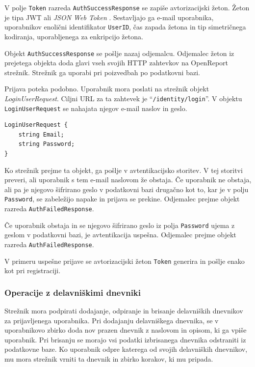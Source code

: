 \documentclass[a4paper, 12pt]{book}
\begin{document}
\noindent V polje \texttt{Token} razreda \texttt{AuthSuccessResponse} se zapiše avtorizacijski žeton.
Žeton je tipa JWT ali \textit{JSON Web Token} \cite{jwtinfo}.
Sestavljajo ga e-mail uporabnika, uporabnikov enolični identifikator \texttt{UserID}, čas zapada žetona in tip simetričnega kodiranja, uporabljenega za enkripcijo žetona.

Objekt \texttt{AuthSuccessResponse} se pošlje nazaj odjemalcu.
Odjemalec žeton iz prejetega objekta doda glavi vseh svojih HTTP zahtevkov na OpenReport strežnik.
Strežnik ga uporabi pri poizvedbah po podatkovni bazi.

Prijava poteka podobno.
Uporabnik mora poslati na strežnik objekt \textit{LoginUserRequest}.
Ciljni URL za ta zahtevek je \enquote{\texttt{/identity/login}}.
V objektu \texttt{LoginUserRequest} se nahajata njegov e-mail naslov in geslo.

\begin{verbatim}
LoginUserRequest {
    string Email; 
    string Password; 
} 
\end{verbatim}

Ko strežnik prejme ta objekt, ga pošlje v avtentikacijsko storitev.
V tej storitvi preveri, ali uporabnik s tem e-mail naslovom že obstaja.
Če uporabnik ne obstaja, ali pa je njegovo šifrirano geslo v podatkovni bazi drugačno kot to, kar je v polju \texttt{Password}, se zabeležijo napake in prijava se prekine.
Odjemalec prejme objekt razreda \texttt{AuthFailedResponse}.

Če uporabnik obstaja in se njegovo šifrirano geslo iz polja \texttt{Password} ujema z geslom v podatkovni bazi, je avtentikacija uspešna.
Odjemalec prejme objekt razreda \texttt{AuthFailedResponse}.

V primeru uspešne prijave se avtorizacijski žeton \texttt{Token} generira in pošlje enako kot pri registraciji.

\subsubsection{Operacije z delavniškimi dnevniki}

Strežnik mora podpirati dodajanje, odpiranje in brisanje delavniških dnevnikov za prijavljenega uporabnika.
Pri dodajanju delavniškega dnevnika, se v uporabnikovo zbirko doda nov prazen dnevnik z naslovom in opisom, ki ga vpiše uporabnik.
Pri brisanju se morajo vsi podatki izbrisanega dnevnika odstraniti iz podatkovne baze.
Ko uporabnik odpre katerega od svojih delavniških dnevnikov, mu mora strežnik vrniti ta dnevnik in zbirko korakov, ki mu pripada.
\end{document}
